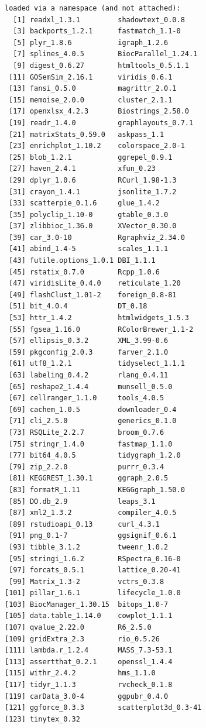 \documentclass[en,black,12pt,normal]{elegantnote}
\begin{document}
\begin{enumerate}
\begin{lstlisting}
loaded via a namespace (and not attached):
  [1] readxl_1.3.1         shadowtext_0.0.8    
  [3] backports_1.2.1      fastmatch_1.1-0     
  [5] plyr_1.8.6           igraph_1.2.6        
  [7] splines_4.0.5        BiocParallel_1.24.1 
  [9] digest_0.6.27        htmltools_0.5.1.1   
 [11] GOSemSim_2.16.1      viridis_0.6.1       
 [13] fansi_0.5.0          magrittr_2.0.1      
 [15] memoise_2.0.0        cluster_2.1.1       
 [17] openxlsx_4.2.3       Biostrings_2.58.0   
 [19] readr_1.4.0          graphlayouts_0.7.1  
 [21] matrixStats_0.59.0   askpass_1.1         
 [23] enrichplot_1.10.2    colorspace_2.0-1    
 [25] blob_1.2.1           ggrepel_0.9.1       
 [27] haven_2.4.1          xfun_0.23           
 [29] dplyr_1.0.6          RCurl_1.98-1.3      
 [31] crayon_1.4.1         jsonlite_1.7.2      
 [33] scatterpie_0.1.6     glue_1.4.2          
 [35] polyclip_1.10-0      gtable_0.3.0        
 [37] zlibbioc_1.36.0      XVector_0.30.0      
 [39] car_3.0-10           Rgraphviz_2.34.0    
 [41] abind_1.4-5          scales_1.1.1        
 [43] futile.options_1.0.1 DBI_1.1.1           
 [45] rstatix_0.7.0        Rcpp_1.0.6          
 [47] viridisLite_0.4.0    reticulate_1.20     
 [49] flashClust_1.01-2    foreign_0.8-81      
 [51] bit_4.0.4            DT_0.18             
 [53] httr_1.4.2           htmlwidgets_1.5.3   
 [55] fgsea_1.16.0         RColorBrewer_1.1-2  
 [57] ellipsis_0.3.2       XML_3.99-0.6        
 [59] pkgconfig_2.0.3      farver_2.1.0        
 [61] utf8_1.2.1           tidyselect_1.1.1    
 [63] labeling_0.4.2       rlang_0.4.11        
 [65] reshape2_1.4.4       munsell_0.5.0       
 [67] cellranger_1.1.0     tools_4.0.5         
 [69] cachem_1.0.5         downloader_0.4      
 [71] cli_2.5.0            generics_0.1.0      
 [73] RSQLite_2.2.7        broom_0.7.6         
 [75] stringr_1.4.0        fastmap_1.1.0       
 [77] bit64_4.0.5          tidygraph_1.2.0     
 [79] zip_2.2.0            purrr_0.3.4         
 [81] KEGGREST_1.30.1      ggraph_2.0.5        
 [83] formatR_1.11         KEGGgraph_1.50.0    
 [85] DO.db_2.9            leaps_3.1           
 [87] xml2_1.3.2           compiler_4.0.5      
 [89] rstudioapi_0.13      curl_4.3.1          
 [91] png_0.1-7            ggsignif_0.6.1      
 [93] tibble_3.1.2         tweenr_1.0.2        
 [95] stringi_1.6.2        RSpectra_0.16-0     
 [97] forcats_0.5.1        lattice_0.20-41     
 [99] Matrix_1.3-2         vctrs_0.3.8         
[101] pillar_1.6.1         lifecycle_1.0.0     
[103] BiocManager_1.30.15  bitops_1.0-7        
[105] data.table_1.14.0    cowplot_1.1.1       
[107] qvalue_2.22.0        R6_2.5.0            
[109] gridExtra_2.3        rio_0.5.26          
[111] lambda.r_1.2.4       MASS_7.3-53.1       
[113] assertthat_0.2.1     openssl_1.4.4       
[115] withr_2.4.2          hms_1.1.0           
[117] tidyr_1.1.3          rvcheck_0.1.8       
[119] carData_3.0-4        ggpubr_0.4.0        
[121] ggforce_0.3.3        scatterplot3d_0.3-41
[123] tinytex_0.32        
    \end{lstlisting}
\end{enumerate}
\end{document}
